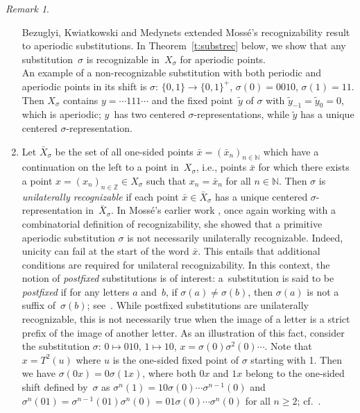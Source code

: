 \documentclass{amsart}
\theoremstyle{definition}
\theoremstyle{remark}
\newtheorem{remark}[lemma]{Remark}
\numberwithin{equation}{section}
\begin{document}
\begin{remark}
\begin{enumerate}
Bezuglyi, Kwiatkowski and Medynets \cite{Bezugly:2009} extended Moss\'{e}'s  recognizability result to aperiodic substitutions. 
In Theorem~\ref{t:substrec} below, we show that any substitution~$\sigma$ is recognizable in~$X_\sigma$ for aperiodic points. \\
An example of a non-recognizable substitution with both periodic and aperiodic points in its shift is $\sigma:\, \{0,1\} \to \{0,1\}^+$, $\sigma(0) = 0010$, $\sigma(1) = 11$.
Then $X_\sigma$ contains $y = \cdots 111 \cdots$ and the fixed point~$\tilde{y}$ of $\sigma$ with $\tilde{y}_{-1} = \tilde{y}_0 = 0$, which is aperiodic; $y$~has two centered $\sigma$-representations, while $\tilde{y}$ has a unique centered $\sigma$-representation.

\item
Let $\bar{X}_\sigma$ be the set of all one-sided points $\bar{x} = (\bar{x}_n)_{n\in \mathbb{N}}$ which have a continuation on the left to a point in~$X_\sigma$, i.e., points $\bar{x}$ for which there exists  a point $x=(x_n)_{n\in \mathbb{Z}}\in X_\sigma$ such that $x_n=\bar{x}_n$ for all $n\in\mathbb N$. Then $\sigma$ is \emph{unilaterally recognizable} if each point $\bar{x}\in \bar{X}_\sigma$  has a unique centered $\sigma$-representation in~$\bar{X}_\sigma$.  In Moss\'{e}'s earlier work \cite{Mosse:92}, once again working with a combinatorial definition of recognizability, she  showed that a primitive aperiodic substitution $\sigma$ is  not necessarily unilaterally recognizable. Indeed, unicity can fail at the start of the word $\bar{x}$. This entails that additional conditions are required for unilateral recognizability.
In this context, the notion of \emph{postfixed} substitutions is of interest: a~substitution is said to be \emph{postfixed} if for any letters $a$ and~$b$, if $\sigma(a) \neq \sigma( b)$, then $\sigma(a)$ is not a suffix of~$\sigma(b)$; see~\cite{Host:1986}. 
While postfixed substitutions are unilaterally recognizable, this is not necessarily true when the image of a letter is a strict prefix of the image of another letter. 
As an illustration of this fact, consider the substitution $\sigma:\, 0 \mapsto 010, \, 1 \mapsto 10$, $x = \sigma(0) \sigma^{2}(0) \cdots$. Note that $x=T^2(u)$ where $u$ is the one-sided fixed point of $\sigma$ starting with 1.
Then we have $\sigma(0x) = 0 \sigma(1x)$, where both $0x$ and $1x$ belong to the one-sided shift defined by~$\sigma$ as $\sigma^n(1) = 1 0 \sigma(0) \cdots \sigma^{n-1}(0)$ and $\sigma^n(01) = \sigma^{n-1}(01) \sigma^n(0) = 01 \sigma(0) \cdots \sigma^n(0)$ for all $n \ge 2$; cf.\ \cite[Example~3.2]{Crabb:10}. 
\end{enumerate}
\end{remark}
\end{document}
